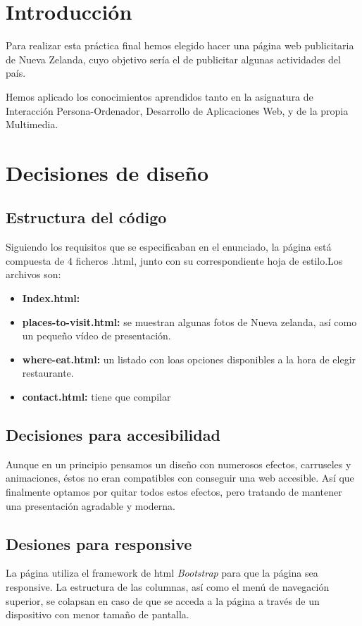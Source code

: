 \section{Introducción}
Para realizar esta práctica final hemos elegido hacer una página web publicitaria de Nueva Zelanda, cuyo objetivo sería el de publicitar algunas actividades del país.

Hemos aplicado los conocimientos aprendidos tanto en la asignatura de Interacción Persona-Ordenador, Desarrollo de Aplicaciones Web, y de la propia Multimedia.
\section{Decisiones de diseño}
\subsection{Estructura del código}
Siguiendo los requisitos que se especificaban en el enunciado, la página está compuesta de 4 ficheros .html, junto con su correspondiente hoja de estilo.Los archivos son:
\begin{itemize}
	\item \textbf{Index.html: }
	\item \textbf{places-to-visit.html: } se muestran algunas fotos de Nueva zelanda, así como un pequeño vídeo de presentación.
	\item \textbf{where-eat.html: }un listado con loas opciones disponibles a la hora de elegir restaurante.
	\item \textbf{contact.html: }tiene que compilar
\end{itemize}

\subsection{Decisiones para accesibilidad}

Aunque en un principio pensamos un diseño con numerosos efectos, carruseles y animaciones, éstos no eran compatibles con conseguir una web accesible. Así que finalmente optamos por quitar todos estos efectos, pero tratando de mantener una presentación agradable y moderna.

\subsection{Desiones para responsive}
La página utiliza el framework de html \textit{Bootstrap} para que la página sea responsive. La estructura de las columnas, así como el menú de navegación superior, se colapsan en caso de que se acceda a la página a través de un dispositivo con menor tamaño de pantalla.
